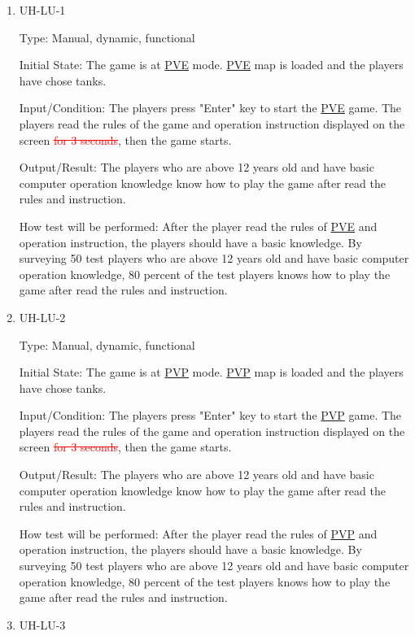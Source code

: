\documentclass[12pt, titlepage]{article}
\begin{document}
\begin{enumerate}
\item{UH-LU-1\\}

Type: Manual, dynamic, functional
					
Initial State: The game is at \underline{PVE} mode. \underline{PVE} map is loaded and the players have chose tanks. 
					
Input/Condition: The players press "Enter" key to start the \underline{PVE} game. The players read the rules of the game and operation instruction displayed on the screen \textcolor{red}{\sout{for 3 seconds}}, then the game starts.
					
Output/Result: The players who are above 12 years old and have basic computer operation knowledge know how to play the game after read the rules and instruction.
					
How test will be performed: After the player read the rules of \underline{PVE} and operation instruction, the players should have a basic knowledge. By surveying 50 test players who are above 12 years old and have basic computer operation knowledge, 80 percent of the test players knows how to play the game after read the rules and instruction.

\item{UH-LU-2\\}

Type: Manual, dynamic, functional
					
Initial State: The game is at \underline{PVP} mode. \underline{PVP} map is loaded and the players have chose tanks.

Input/Condition: The players press "Enter" key to start the \underline{PVP} game. The players read the rules of the game and operation instruction displayed on the screen \textcolor{red}{\sout{for 3 seconds}}, then the game starts.
					
Output/Result: The players who are above 12 years old and have basic computer operation knowledge know how to play the game after read the rules and instruction.
					
How test will be performed: After the player read the rules of \underline{PVP} and operation instruction, the players should have a basic knowledge. By surveying 50 test players who are above 12 years old and have basic computer operation knowledge, 80 percent of the test players knows how to play the game after read the rules and instruction.

\item{UH-LU-3\\}


\end{enumerate}
\end{document}
